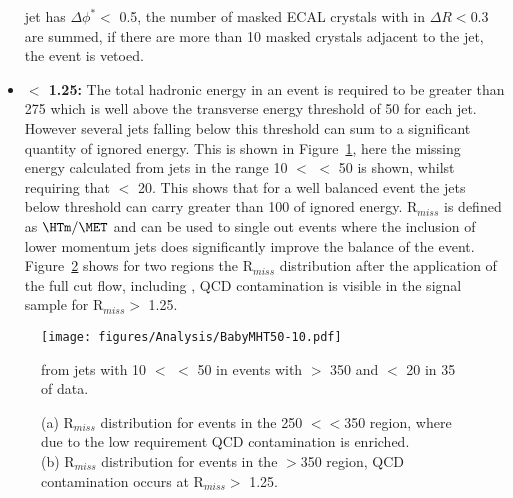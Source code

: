 \begin{itemize}
jet has $\Delta\phi^{*} <$ 0.5, the number of masked ECAL crystals with in 
$\Delta R < $0.3 are summed, if there are more than 10 masked crystals adjacent 
to the jet, the event is vetoed.
\item \textbf{\Rmiss$ <$ 1.25:} The total hadronic energy in an event is 
required to be greater than \unit{275}{\GeV} which is well above the transverse 
energy threshold of \unit{50}{\GeV} for each jet. However several jets falling 
below this threshold can sum to a significant quantity of ignored energy. This 
is shown in Figure~\ref{fig:figures_Analysis_BabyMHT50-10}, here the missing 
energy calculated from jets in the range \unit{10}{\GeV} $<$ \ET $<$ 
\unit{50}{\GeV} is shown, whilst requiring that \MET $<$ \unit{20}{\GeV}. This 
shows that for a well balanced event the jets below threshold can carry greater 
than \unit{100}{\GeV} of ignored energy. R$_{miss}$ is defined as $\HTm \slash 
\MET$ and can be used to single out events where the inclusion of lower 
momentum jets does significantly improve the balance of the event. 
Figure~\ref{fig:MHTovMET_lowHT_highHT} shows for two \HT regions the R$_{miss}$ 
distribution after the application of the full cut flow, including \alt, QCD 
contamination is visible in the signal sample for R$_{miss} >$ 1.25. 
\end{itemize}


\begin{figure}[htbp]
  \centering
    \texttt{[image: figures/Analysis/BabyMHT50-10.pdf]}
  \caption{\HTm from jets with \unit{10}{\GeV} $<$ \ET $<$ \unit{50}{\GeV} in events with \HT $>$ \unit{350}{\GeV} and \MET $<$ \unit{20}{\GeV} in \unit{35}{\invpicobarn} of data.}
  \label{fig:figures_Analysis_BabyMHT50-10}
\end{figure}

\begin{figure}[htbp]
  \centering
\caption{(a) R$_{miss}$ distribution for events in the \unit{250}{\GeV} 
$<$\HT$<$\unit{350}{\GeV} region, where due to the low \HT requirement QCD 
contamination is enriched. \\ (b) R$_{miss}$ distribution for events in the 
\HT$>$\unit{350}{\GeV} region, QCD contamination occurs at R$_{miss} >$ 1.25.}
\label{fig:MHTovMET_lowHT_highHT}
\end{figure}


